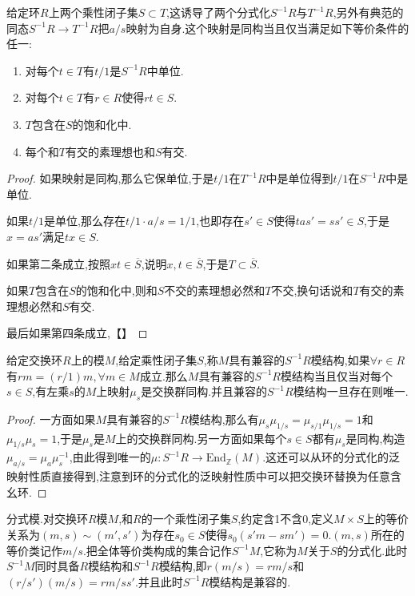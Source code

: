 给定环$R$上两个乘性闭子集$S\subset T$,这诱导了两个分式化$S^{-1}R$与$T^{-1}R$,另外有典范的同态$S^{-1}R\to T^{-1}R$把$a/s$映射为自身.这个映射是同构当且仅当满足如下等价条件的任一:
\begin{enumerate}
	\item 对每个$t\in T$有$t/1$是$S^{-1}R$中单位.
	\item 对每个$t\in T$有$r\in R$使得$rt\in S$.
	\item $T$包含在$S$的饱和化中.
	\item 每个和$T$有交的素理想也和$S$有交.
\end{enumerate}
\begin{proof}
	
	如果映射是同构,那么它保单位,于是$t/1$在$T^{-1}R$中是单位得到$t/1$在$S^{-1}R$中是单位.
	
	如果$t/1$是单位,那么存在$t/1\cdot a/s=1/1$,也即存在$s'\in S$使得$tas'=ss'\in S$,于是$x=as'$满足$tx\in S$.
	
	如果第二条成立,按照$xt\in\overline{S}$,说明$x,t\in\overline{S}$,于是$T\subset\overline{S}$.
	
	如果$T$包含在$S$的饱和化中,则和$S$不交的素理想必然和$T$不交,换句话说和$T$有交的素理想必然和$S$有交.
	
	最后如果第四条成立,【】
\end{proof}

给定交换环$R$上的模$M$,给定乘性闭子集$S$,称$M$具有兼容的$S^{-1}R$模结构,如果$\forall r\in R$有$rm=(r/1)m,\forall m\in M$成立.那么$M$具有兼容的$S^{-1}R$模结构当且仅当对每个$s\in S$,有左乘$s$的$M$上映射$\mu_s$是交换群同构.并且兼容的$S^{-1}R$模结构一旦存在则唯一.
\begin{proof}
	
	一方面如果$M$具有兼容的$S^{-1}R$模结构,那么有$\mu_s\mu_{1/s}=\mu_{s/1}\mu_{1/s}=1$和$\mu_{1/s}\mu_s=1$,于是$\mu_s$是$M$上的交换群同构.另一方面如果每个$s\in S$都有$\mu_s$是同构,构造$\mu_{a/s}=\mu_a\mu_s^{-1}$,由此得到唯一的$\mu:S^{-1}R\to\mathrm{End}_{\mathbb{Z}}(M)$.这还可以从环的分式化的泛映射性质直接得到,注意到环的分式化的泛映射性质中可以把交换环替换为任意含幺环.
\end{proof}

分式模.对交换环$R$模$M$,和$R$的一个乘性闭子集$S$,约定含1不含0,定义$M\times S$上的等价关系为$(m,s)\sim(m',s')$为存在$s_0\in S$使得$s_0(s'm-sm')=0$.$(m,s)$所在的等价类记作$m/s$.把全体等价类构成的集合记作$S^{-1}M$,它称为$M$关于$S$的分式化.此时$S^{-1}M$同时具备$R$模结构和$S^{-1}R$模结构,即$r(m/s)=rm/s$和$(r/s')(m/s)=rm/ss'$.并且此时$S^{-1}R$模结构是兼容的.

